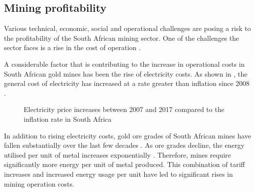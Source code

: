 	\subsection{Mining profitability}
	 	Various technical, economic, social and operational challenges are posing a risk to the profitability of the South African mining sector. One of the challenges the sector faces is a rise in the cost of operation \cite{neingo2016trends}.
	 	\par
		A considerable factor that is contributing to the increase in operational costs in South African gold mines has been the rise of electricity costs. As shown in , the general cost of electricity has increased at a rate greater than inflation since 2008 \cite{Eskom2013Tariffs}.
		\begin{figure}[h]
			\centering
			\fbox{}
			\caption[Electricity price increases between 2007 and 2017 compared to the inflation rate in South Africa]{Electricity price increases between 2007 and 2017 \cite{Eskom2013Tariffs} compared to the inflation rate in South Africa\protect\footnotemark[1]}
			\label{fig: Eskom tariffs}
		\end{figure}
		\par
		In addition to rising electricity costs, gold ore grades of South African mines have fallen substantially over the last few decades \cite{mudd2007global}. As ore grades decline, the energy utilised per unit of metal increases exponentially \cite{muller2010numerical}. Therefore, mines require significantly more energy per unit of metal produced. This combination of tariff increases and increased energy usage per unit have led to significant rises in mining operation costs.
